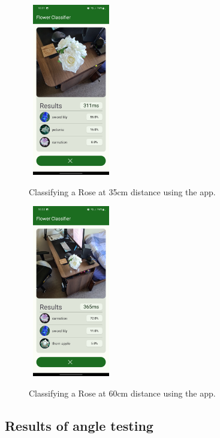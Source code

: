 \documentclass[12pt,a4paper]{report}
\begin{document}
\begin{figure}[h]\
    \includegraphics[width=0.3\textwidth]{rose_35cm.jpg}
    \caption{Classifying a Rose at 35cm distance using the app.}
    \label{fig:rose_35}
\end{figure}

\begin{figure}[h]\
    \includegraphics[width=0.3\textwidth]{rose_60cm.jpg}
    \caption{Classifying a Rose at 60cm distance using the app.}
    \label{fig:rose_60}
\end{figure}

\clearpage

\subsection{Results of angle testing}
\end{document}
